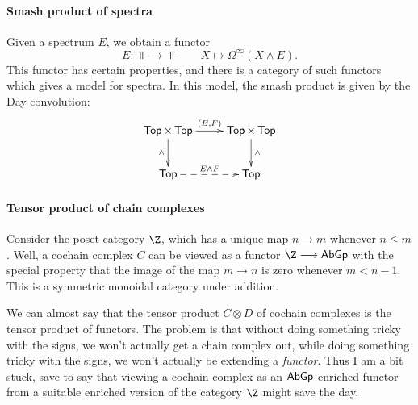 \documentclass[11pt]{article}
\begin{document}
\begin{2. Kan Extensions}
\begin{shaded}
\paragraph*{Smash product of spectra}
Given a spectrum $E$, we obtain a functor
\[E:\Top\to\Top\qquad X\mapsto \Omega^\infty(X\wedge E).\]
This functor has certain properties, and there is a category of such functors which gives a model for spectra. In this model, the smash product is given by the Day convolution:
\[\xymatrix{
\Top\times\Top\ar[r]^-{(E,F)}\ar[d]_-{\wedge }&%
\Top\times\Top\ar[d]^-{\wedge }\\%
\Top\ar@{-->}[r]^-{E\wedge F}&%
\Top%
}\]
\paragraph*{Tensor product of chain complexes}
Consider the poset category $\Z$, which has a unique map $n\to m$ whenever $n\leq m$. Well, a cochain complex $C$ can be viewed as a functor $\Z\to\AbGp$ with the special property that the image of the map $m\to n$ is zero whenever $m<n-1$. This is a symmetric monoidal category under addition.

We can almost say that the tensor product $C\otimes D$ of cochain complexes is the tensor product of functors. The problem is that without doing something tricky with the signs, we won't actually get a chain complex out, while doing something tricky with the signs, we won't actually be extending a \emph{functor}. Thus I am a bit stuck, save to say that viewing a cochain complex as an $\operatorname{{\mathsf{AbGp}}}$-enriched functor from a suitable enriched version of the category $\Z$ might save the day.
\end{shaded}
\end{2. Kan Extensions}
\end{document}
